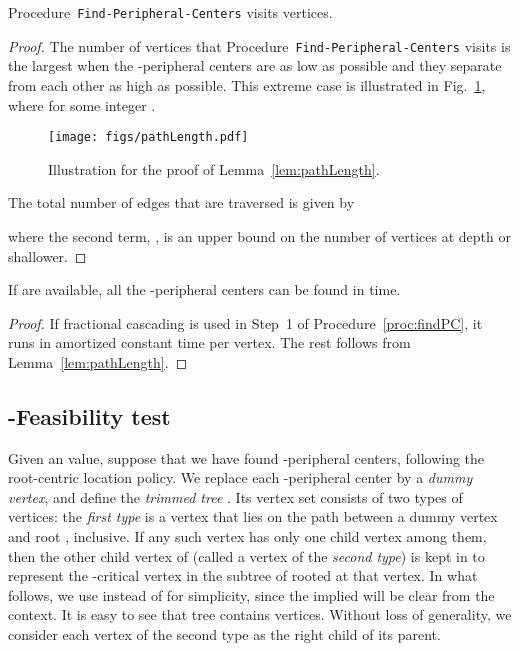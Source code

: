 \documentclass{llncs}
\newcommand{\QED}{\hfill}
\begin{document}
{\begin{lemma}\label{lem:pathLength}
Procedure~{\tt Find-Peripheral-Centers} visits 
 vertices.
\end{lemma}
\begin{proof}
The number of vertices that Procedure~{\tt Find-Peripheral-Centers}
visits is the largest when the -peripheral centers are as low as possible
and they separate from each other as high as possible.
This extreme case is illustrated in Fig.~\ref{fig:pathLength},
where  for some integer .
\begin{figure}[h]
\centering
\texttt{[image: figs/pathLength.pdf]}
\caption{Illustration for the proof of Lemma~\ref{lem:pathLength}.}
\label{fig:pathLength}
\end{figure}
The total number of edges that are traversed is given by

where the second term, , is an upper bound on the number of vertices at depth  or shallower.
\QED
\end{proof}

\begin{lemma}\label{lem:findPC}
If  
are available,
all the -peripheral centers can be found in  time.
\end{lemma}
\begin{proof}
If fractional cascading is used in Step~1 of Procedure~\ref{proc:findPC},
it runs in amortized constant time per vertex.
The rest follows from Lemma~\ref{lem:pathLength}.
\QED
\end{proof}

\subsection{-Feasibility test}\label{sec:test}
Given an  value,
suppose that we have found  -peripheral centers,
following the root-centric location policy.
We replace each -peripheral center by a {\em dummy vertex},
and define the {\em trimmed tree} .
Its vertex set  consists of two types of vertices:
the {\em first type} is a vertex that lies on the path between a dummy vertex and root , inclusive.
If any such vertex has only one child vertex among them,
then the other child vertex of  (called a vertex of the {\em second type}) is kept in 
to represent the -critical vertex in the subtree of  rooted at that vertex.
In what follows, we use  instead of  for simplicity,
since the implied  will be clear from the context.
It is easy to see that tree  contains  vertices.
Without loss of generality,
we consider each vertex of the second type as the right child of its parent.

}
\end{document}
